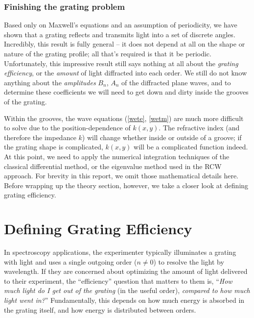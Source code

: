 \subsubsection{Finishing the grating problem}
Based only on Maxwell's equations and an assumption of periodicity, we have shown that a grating reflects and transmits light into a set of discrete angles.  Incredibly, this result is fully general -- it does not depend at all on the shape or nature of the grating profile; all that's required is that it be periodic.  Unfortunately, this impressive result still says nothing at all about the \emph{grating efficiency}, or the \emph{amount} of light diffracted into each order.  We still do not know anything about the \emph{amplitudes} $B_n$, $A_n$ of the diffracted plane waves, and to determine these coefficients we will need to get down and dirty inside the grooves of the grating.

Within the grooves, the wave equations (\ref{wete}, \ref{wetm}) are much more difficult to solve due to the position-dependence of $k(x,y)$.  The refractive index (and therefore the impedance $k$) will change whether inside or outside of a groove; if the grating shape is complicated, $k(x,y)$ will be a complicated function indeed.
At this point, we need to apply the numerical integration techniques of the classical differential method, or the eigenvalue method used in the RCW approach.  For brevity in this report, we omit those mathematical details here.  Before wrapping up the theory section, however, we take a closer look at defining grating efficiency.


\section{Defining Grating Efficiency}
In spectroscopy applications, the experimenter typically illuminates a grating with light and uses a single outgoing order ($n\neq0$) to resolve the light by wavelength.  If they are concerned about optimizing the amount of light delivered to their experiment, the ``efficiency'' question that matters to them is, ``\emph{How much light do I get out of the grating} (in the useful order), \emph{compared to how much light went in?}''  Fundamentally, this depends on how much energy is absorbed in the grating itself, and how energy is distributed between orders.

